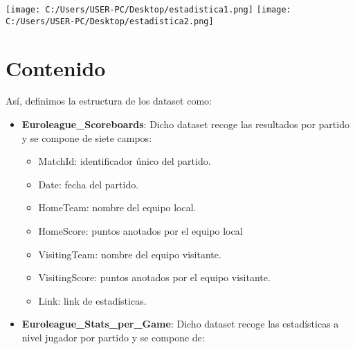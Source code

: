 \documentclass[]{article}
\providecommand{\tightlist}{%
  \setlength{\itemsep}{0pt}\setlength{\parskip}{0pt}}
\begin{document}
\texttt{[image: C:/Users/USER-PC/Desktop/estadistica1.png]}
\texttt{[image: C:/Users/USER-PC/Desktop/estadistica2.png]}

\hypertarget{contenido}{%
\section{Contenido}\label{contenido}}

Así, definimos la estructura de los dataset como:

\begin{itemize}
\tightlist
\item
  \textbf{Euroleague\_Scoreboards}: Dicho dataset recoge las resultados
  por partido y se compone de siete campos:

  \begin{itemize}
  \tightlist
  \item
    MatchId: identificador único del partido.
  \item
    Date: fecha del partido.
  \item
    HomeTeam: nombre del equipo local.
  \item
    HomeScore: puntos anotados por el equipo local
  \item
    VisitingTeam: nombre del equipo visitante.
  \item
    VisitingScore: puntos anotados por el equipo visitante.
  \item
    Link: link de estadísticas.
  \end{itemize}
\item
  \textbf{Euroleague\_Stats\_per\_Game}: Dicho dataset recoge las
  estadísticas a nivel jugador por partido y se compone de:


\end{itemize}
\end{document}
